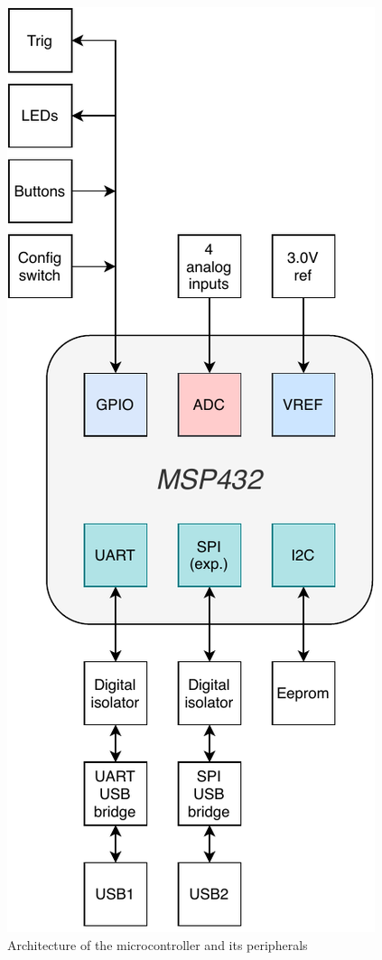 \documentclass[12pt,a4paper]{article}
\begin{document}
\begin{figure}[ht!]
\includegraphics[scale=1]{architecture.pdf}
\caption{Architecture of the microcontroller and its peripherals}
\label{fig:architecture}
\end{figure}
\end{document}
